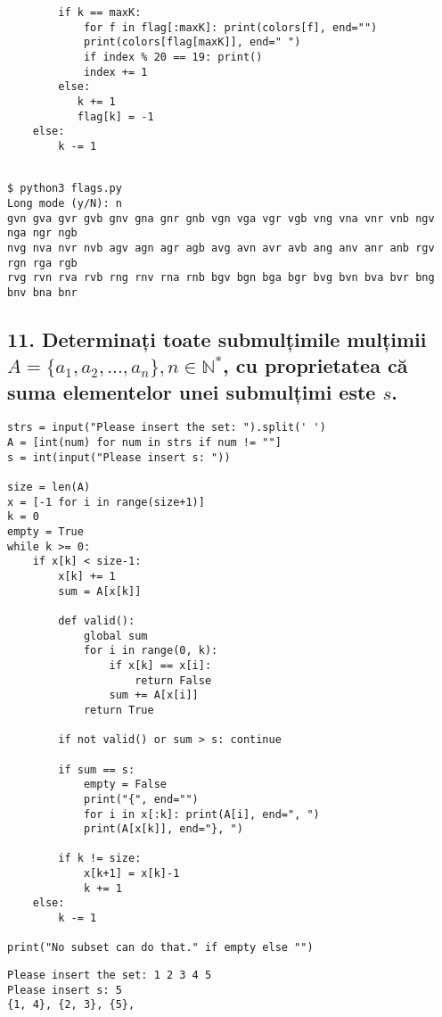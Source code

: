 \documentclass[11pt]{article}
\begin{document}
\begin{itemize}
\begin{itemize}
\begin{verbatim}
        if k == maxK: 
            for f in flag[:maxK]: print(colors[f], end="")
            print(colors[flag[maxK]], end=" ")
            if index % 20 == 19: print()
            index += 1
        else:
           k += 1
           flag[k] = -1
    else:
        k -= 1


\end{verbatim}
\begin{verbatim}
$ python3 flags.py
Long mode (y/N): n
gvn gva gvr gvb gnv gna gnr gnb vgn vga vgr vgb vng vna vnr vnb ngv nga ngr ngb 
nvg nva nvr nvb agv agn agr agb avg avn avr avb ang anv anr anb rgv rgn rga rgb 
rvg rvn rva rvb rng rnv rna rnb bgv bgn bga bgr bvg bvn bva bvr bng bnv bna bnr 
\end{verbatim}

\subsection*{11. Determinați toate submulțimile mulțimii \(A = \{a_1, a_2, ..., a_n\}, n \in \mathbb{N}^*\), cu proprietatea că suma elementelor unei submulțimi este \(s\).}
\label{sec:orgd2b5bed}

\begin{verbatim}
strs = input("Please insert the set: ").split(' ')
A = [int(num) for num in strs if num != ""]
s = int(input("Please insert s: "))

size = len(A)
x = [-1 for i in range(size+1)]
k = 0
empty = True
while k >= 0:
    if x[k] < size-1:
        x[k] += 1        
        sum = A[x[k]]

        def valid():
            global sum
            for i in range(0, k):
                if x[k] == x[i]: 
                    return False
                sum += A[x[i]]
            return True

        if not valid() or sum > s: continue

        if sum == s:
            empty = False
            print("{", end="")
            for i in x[:k]: print(A[i], end=", ")
            print(A[x[k]], end="}, ")

        if k != size:
            x[k+1] = x[k]-1
            k += 1
    else:
        k -= 1

print("No subset can do that." if empty else "")
\end{verbatim}

\begin{verbatim}
Please insert the set: 1 2 3 4 5
Please insert s: 5
{1, 4}, {2, 3}, {5}, 


\end{verbatim}
\end{itemize}
\end{itemize}
\end{document}
